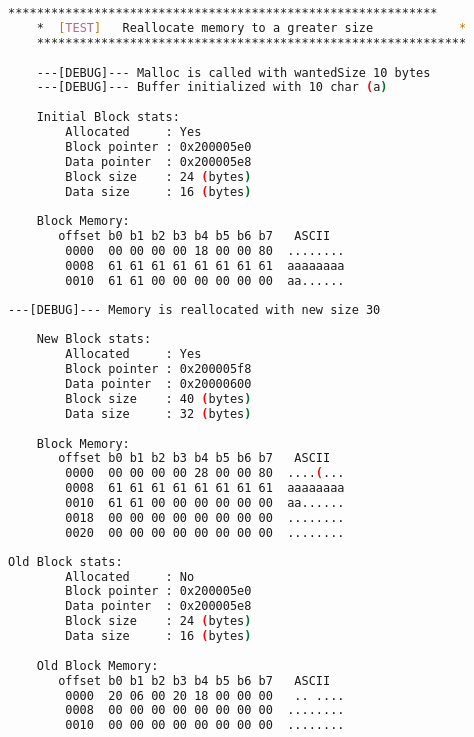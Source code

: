     \begin{outputbox}
    \begin{lstlisting}[language=bash]
    ************************************************************
    *  [TEST]   Reallocate memory to a greater size            *
    ************************************************************
    
    ---[DEBUG]--- Malloc is called with wantedSize 10 bytes
    ---[DEBUG]--- Buffer initialized with 10 char (a)
    
    Initial Block stats:
        Allocated     : Yes
        Block pointer : 0x200005e0
        Data pointer  : 0x200005e8
        Block size    : 24 (bytes)
        Data size     : 16 (bytes)
    
    Block Memory:
       offset b0 b1 b2 b3 b4 b5 b6 b7   ASCII
        0000  00 00 00 00 18 00 00 80  ........
        0008  61 61 61 61 61 61 61 61  aaaaaaaa
        0010  61 61 00 00 00 00 00 00  aa......
    \end{lstlisting}
    \end{outputbox}
    
    \begin{outputbox}
    \begin{lstlisting}[language=bash]
    ---[DEBUG]--- Memory is reallocated with new size 30
    
    New Block stats:
        Allocated     : Yes
        Block pointer : 0x200005f8
        Data pointer  : 0x20000600
        Block size    : 40 (bytes)
        Data size     : 32 (bytes)
    
    Block Memory:
       offset b0 b1 b2 b3 b4 b5 b6 b7   ASCII
        0000  00 00 00 00 28 00 00 80  ....(...
        0008  61 61 61 61 61 61 61 61  aaaaaaaa
        0010  61 61 00 00 00 00 00 00  aa......
        0018  00 00 00 00 00 00 00 00  ........
        0020  00 00 00 00 00 00 00 00  ........
    \end{lstlisting}
    \end{outputbox}
    
    \begin{outputbox}
    \begin{lstlisting}[language=bash]
    Old Block stats:
        Allocated     : No
        Block pointer : 0x200005e0
        Data pointer  : 0x200005e8
        Block size    : 24 (bytes)
        Data size     : 16 (bytes)
    
    Old Block Memory:
       offset b0 b1 b2 b3 b4 b5 b6 b7   ASCII
        0000  20 06 00 20 18 00 00 00   .. ....
        0008  00 00 00 00 00 00 00 00  ........
        0010  00 00 00 00 00 00 00 00  ........
    \end{lstlisting}
    \end{outputbox}
    
